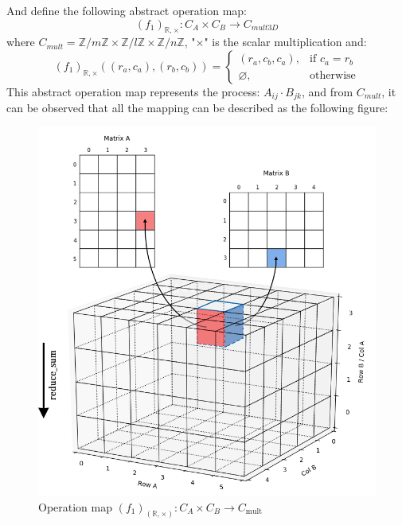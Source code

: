 \documentclass{amsart}
\theoremstyle{definition}
\theoremstyle{remark}
\numberwithin{equation}{section}
\begin{document}
And define the following abstract operation map:
\begin{equation}
(f_1)_{\mathbb{R},\times}:C_A\times C_B\to C_{mult3D}
\end{equation}
where $C_{mult}=\mathbb{Z}/{m\mathbb{Z}}\times \mathbb{Z}/{l\mathbb{Z}}\times \mathbb{Z}/{n\mathbb{Z}}$, "$\times$" is the scalar multiplication and:
\begin{equation}
(f_1)_{\mathbb{R},\times}((r_a,c_a),(r_b,c_b))=
\left\{
\begin{array}{ll}  
             (r_a,c_b,c_a), &\text{if } c_a=r_b  \\ 
             \varnothing, &\text{otherwise}
\end{array}
\right.
\end{equation}
	This abstract operation map represents the process: $A_{ij}\cdot B_{jk}$, and from $C_{mult}$, it can be observed that all the mapping can be described as the following figure:
\begin{figure}[tb]
	\includegraphics[scale=0.3]{Figures/Matrix3d.png}
	\caption{Operation map $(f_1)_(\mathbb{R},\times ):C_A\times C_B\to C_{\text{mult}}$}
	\label{Fig:1}
\end{figure}
\end{document}
